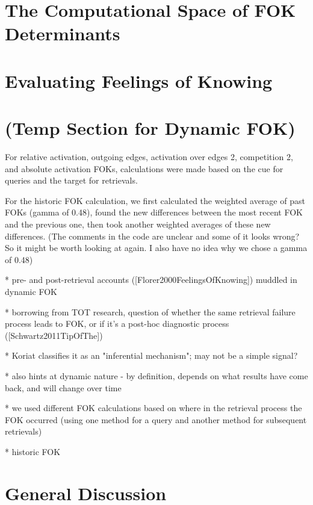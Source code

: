 \documentclass[10pt,letterpaper]{article}
\begin{document}
\section{The Computational Space of FOK Determinants}


		
\section{Evaluating Feelings of Knowing}

\section{(Temp Section for Dynamic FOK)}

For relative activation, outgoing edges, activation over edges 2,  competition 2, and absolute activation FOKs, calculations were made based on the cue for queries and the target for retrievals.

For the historic FOK calculation, we first calculated the weighted average of past FOKs (gamma of 0.48), found the new differences between the most recent FOK and the previous one, then took another weighted averages of these new differences. (The comments in the code are unclear and some of it looks wrong? So it might be worth looking at again. I also have no idea why we chose a gamma of 0.48)

* pre- and post-retrieval accounts ([Florer2000FeelingsOfKnowing]) muddled in dynamic FOK


    * borrowing from TOT research, question of whether the same retrieval failure process leads to FOK, or if it's a post-hoc diagnostic process ([Schwartz2011TipOfThe])
   
   
* Koriat classifies it as an "inferential mechanism"; may not be a simple signal?


            * also hints at dynamic nature - by definition, depends on what results have come back, and will change over time

            
* we used different FOK calculations based on where in the retrieval process the FOK occurred (using one method for a query and another method for subsequent retrievals)


* historic FOK

\section{General Discussion}
\end{document}
